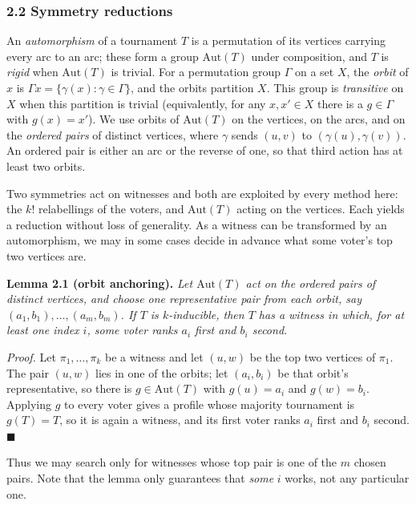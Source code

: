 \documentclass[
]{article}
\begin{document}
\subsubsection{2.2 Symmetry reductions}\label{symmetry-reductions}

An \emph{automorphism} of a tournament \(T\) is a permutation of its
vertices carrying every arc to an arc; these form a group
\(\mathrm{Aut}(T)\) under composition, and \(T\) is \emph{rigid} when
\(\mathrm{Aut}(T)\) is trivial. For a permutation group \(\Gamma\) on a
set \(X\), the \emph{orbit} of \(x\) is
\(\Gamma x = \{\gamma(x) : \gamma \in \Gamma\}\), and the orbits
partition \(X\). This group is \emph{transitive} on \(X\) when this
partition is trivial (equivalently, for any \(x, x' \in X\) there is a
\(g \in \Gamma\) with \(g(x) = x'\)). We use orbits of
\(\mathrm{Aut}(T)\) on the vertices, on the arcs, and on the
\emph{ordered pairs} of distinct vertices, where \(\gamma\) sends
\((u,v)\) to \((\gamma(u), \gamma(v))\). An ordered pair is either an
arc or the reverse of one, so that third action has at least two orbits.

Two symmetries act on witnesses and both are exploited by every method
here: the \(k!\) relabellings of the voters, and \(\mathrm{Aut}(T)\)
acting on the vertices. Each yields a reduction without loss of
generality. As a witness can be transformed by an automorphism, we may
in some cases decide in advance what some voter's top two vertices are.

\textbf{Lemma 2.1 (orbit anchoring).} \emph{Let \(\mathrm{Aut}(T)\) act
on the ordered pairs of distinct vertices, and choose one representative
pair from each orbit, say \((a_1, b_1), \dots, (a_m, b_m)\). If \(T\) is
\(k\)-inducible, then \(T\) has a witness in which, for at least one
index \(i\), some voter ranks \(a_i\) first and \(b_i\) second.}

\emph{Proof.} Let \(\pi_1, \dots, \pi_k\) be a witness and let
\((u, w)\) be the top two vertices of \(\pi_1\). The pair \((u,w)\) lies
in one of the orbits; let \((a_i, b_i)\) be that orbit's representative,
so there is \(g \in \mathrm{Aut}(T)\) with \(g(u) = a_i\) and
\(g(w) = b_i\). Applying \(g\) to every voter gives a profile whose
majority tournament is \(g(T) = T\), so it is again a witness, and its
first voter ranks \(a_i\) first and \(b_i\) second. \(\blacksquare\)

Thus we may search only for witnesses whose top pair is one of the \(m\)
chosen pairs. Note that the lemma only guarantees that \emph{some} \(i\)
works, not any particular one.
\end{document}
